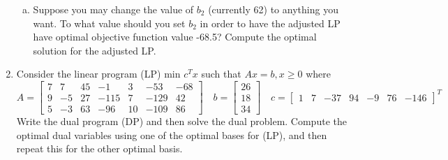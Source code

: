 \documentclass{article}
\begin{document}
\begin{enumerate}
\begin{enumerate}[a)]
			\item Suppose you may change the value of $b_2$ (currently 62) to anything you want. To what value should you set $b_2$ in order to have the adjusted LP have optimal objective function value -68.5? Compute the optimal solution for the adjusted LP.

		\end{enumerate}

	\item Consider the linear program (LP) min $c^T x$ such that $Ax=b, x\ge 0$ where \[ A=\begin{bmatrix}
				7 & 7 & 45 & -1 & 3 & -53 & -68 \\
				9 & -5 & 27 & -115 & 7 & -129 & 42 \\
				5 & -3 & 63 & -96 & 10 & -109 & 86
			\end{bmatrix}\quad b=\begin{bmatrix}
				26 \\ 18 \\ 34
			\end{bmatrix}\quad c=\begin{bmatrix}
				1 & 7 & -37 & 94 & -9 & 76 & -146
		\end{bmatrix}^T\] Write the dual program (DP) and then solve the dual problem. Compute the optimal dual variables using one of the optimal bases for (LP), and then repeat this for the other optimal basis.

\end{enumerate}
\end{document}

